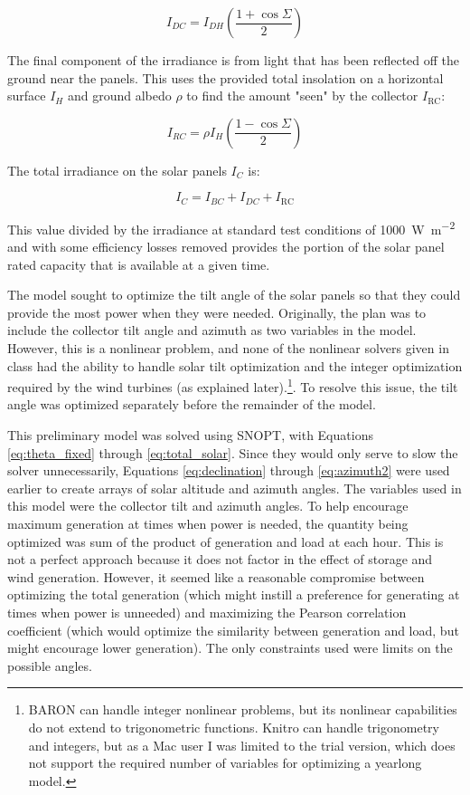 \documentclass{article}
\begin{document}
\begin{equation}
I_{\mathit{DC}} = I_{\mathit{DH}} \left(\frac{1 + \cos \Sigma}{2}\right)
\label{eq:diffuse_fixed}
\end{equation}

The final component of the irradiance is from light that has been reflected off the ground near the panels.  This uses the provided total insolation on a horizontal surface $I_H$ and ground albedo $\rho$ to find the amount "seen" by the collector $I_{\mbox{RC}}$:

\begin{equation}
I_{\mathit{RC}} = \rho I_H \left(\frac{1 - \cos \Sigma}{2}\right)
\label{eq:reflected_fixed}
\end{equation}

The total irradiance on the solar panels $I_C$ is:

\begin{equation}
I_C = I_{\mathit{BC}} + I_{\mathit{DC}} + I_{\mbox{RC}}
\label{eq:total_solar}
\end{equation}

This value divided by the irradiance at standard test conditions of \SI{1000}{\watt\per\meter\squared} and with some efficiency losses removed provides the portion of the solar panel rated capacity that is available at a given time.

The model sought to optimize the tilt angle of the solar panels so that they could provide the most power when they were needed.  Originally, the plan was to include the collector tilt angle and azimuth as two variables in the model.  However, this is a nonlinear problem, and none of the nonlinear solvers given in class had the ability to handle solar tilt optimization and the integer optimization required by the wind turbines (as explained later).\footnote{BARON can handle integer nonlinear problems, but its nonlinear capabilities do not extend to trigonometric functions.  Knitro can handle trigonometry and integers, but as a Mac user I was limited to the trial version, which does not support the required number of variables for optimizing a yearlong model.}.  To resolve this issue, the tilt angle was optimized separately before the remainder of the model.  

This preliminary model was solved using SNOPT, with Equations \ref{eq:theta_fixed} through \ref{eq:total_solar}.  Since they would only serve to slow the solver unnecessarily, Equations \ref{eq:declination} through \ref{eq:azimuth2} were used earlier to create arrays of solar altitude and azimuth angles.  The variables used in this model were the collector tilt and azimuth angles.  To help encourage maximum generation at times when power is needed, the quantity being optimized was sum of the product of generation and load at each hour.  This is not a perfect approach because it does not factor in the effect of storage and wind generation.  However, it seemed like a reasonable compromise between optimizing the total generation (which might instill a preference for generating at times when power is unneeded) and maximizing the Pearson correlation coefficient (which would optimize the similarity between generation and load, but might encourage lower generation).  The only constraints used were limits on the possible angles.
\end{document}
